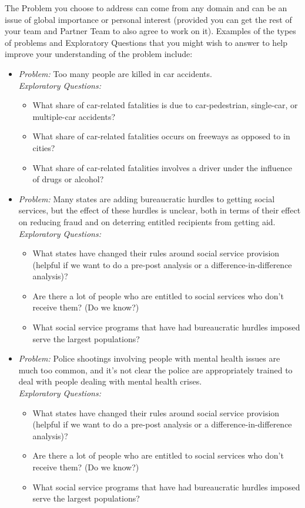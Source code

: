 \documentclass[12pt]{article}
\begin{document}
The Problem you choose to address can come from any domain and can be an issue of global importance or personal interest (provided you can get the rest of your team and Partner Team to also agree to work on it). Examples of the types of problems and Exploratory Questions that you might wish to answer to help improve your understanding of the problem include:

\begin{itemize}
    \item \emph{Problem:} Too many people are killed in car accidents. \\
    \emph{Exploratory Questions:}
    \begin{itemize}
        \item What share of car-related fatalities is due to car-pedestrian, single-car, or multiple-car accidents?
        \item What share of car-related fatalities occurs on freeways as opposed to in cities?
        \item What share of car-related fatalities involves a driver under the influence of drugs or alcohol?
    \end{itemize}
    \item \emph{Problem:} Many states are adding bureaucratic hurdles to getting social services, but the effect of these hurdles is unclear, both in terms of their effect on reducing fraud and on deterring entitled recipients from getting aid.  \\
    \emph{Exploratory Questions:}
    \begin{itemize}
        \item What states have changed their rules around social service provision (helpful if we want to do a pre-post analysis or a difference-in-difference analysis)?
        \item Are there a lot of people who are entitled to social services who don't receive them? (Do we know?)
        \item What social service programs that have had bureaucratic hurdles imposed serve the largest populations?
    \end{itemize}
    \item \emph{Problem:} Police shootings involving people with mental health issues are much too common, and it's not clear the police are appropriately trained to deal with people dealing with mental health crises. \\
    \emph{Exploratory Questions:}
    \begin{itemize}
        \item What states have changed their rules around social service provision (helpful if we want to do a pre-post analysis or a difference-in-difference analysis)?
        \item Are there a lot of people who are entitled to social services who don't receive them? (Do we know?)
        \item What social service programs that have had bureaucratic hurdles imposed serve the largest populations?
    \end{itemize}
\end{itemize}
\end{document}
